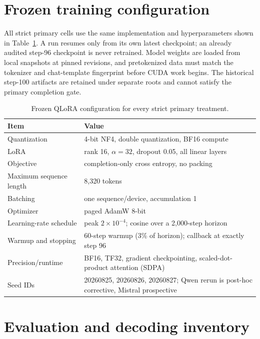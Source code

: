 \documentclass[11pt]{article}
\begin{document}
\appendix

\section{Frozen training configuration}

All strict primary cells use the same implementation and hyperparameters shown in Table~\ref{tab:training-config}. A run resumes only from its own latest checkpoint; an already audited step-96 checkpoint is never retrained. Model weights are loaded from local snapshots at pinned revisions, and pretokenized data must match the tokenizer and chat-template fingerprint before CUDA work begins. The historical step-100 artifacts are retained under separate roots and cannot satisfy the primary completion gate.

\begin{table}[h]
\centering
\small
\caption{Frozen QLoRA configuration for every strict primary treatment.}
\label{tab:training-config}
\begin{tabularx}{\linewidth}{@{}lX@{}}
\toprule
Item & Value \\
\midrule
Quantization & 4-bit NF4, double quantization, BF16 compute \\
LoRA & rank 16, $\alpha=32$, dropout 0.05, all linear layers \\
Objective & completion-only cross entropy, no packing \\
Maximum sequence length & 8,320 tokens \\
Batching & one sequence/device, accumulation 1 \\
Optimizer & paged AdamW 8-bit \\
Learning-rate schedule & peak $2\times10^{-4}$; cosine over a 2,000-step horizon \\
Warmup and stopping & 60-step warmup (3\% of horizon); callback at exactly step 96 \\
Precision/runtime & BF16, TF32, gradient checkpointing, scaled-dot-product attention (SDPA) \\
Seed IDs & 20260825, 20260826, 20260827; Qwen rerun is post-hoc corrective, Mistral prospective \\
\bottomrule
\end{tabularx}
\end{table}

\section{Evaluation and decoding inventory}
\end{document}
